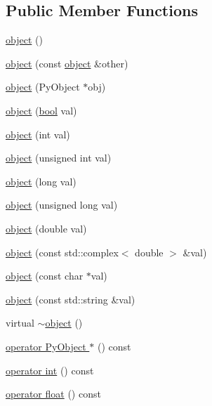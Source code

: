 \subsection*{Public Member Functions}
\begin{DoxyCompactItemize}
\item 
\hyperlink{classpy_1_1object_a34f56f5c741541da1b5b5b7615d378ad}{object} ()
\item 
\hyperlink{classpy_1_1object_a5d3964d8103ee8b8219dca5a631b679f}{object} (const \hyperlink{classpy_1_1object}{object} \&other)
\item 
\hyperlink{classpy_1_1object_a2fb78a0a73304065d05f899ca6edf3b6}{object} (Py\+Object $\ast$obj)
\item 
\hyperlink{classpy_1_1object_ab448083caebceb882ca1a9f420b668a3}{object} (\hyperlink{compiler_8h_abb452686968e48b67397da5f97445f5b}{bool} val)
\item 
\hyperlink{classpy_1_1object_a7d78412f168fe2d368f37c69cb0e1de6}{object} (int val)
\item 
\hyperlink{classpy_1_1object_a175aff9106537cf87a411ff0a492167e}{object} (unsigned int val)
\item 
\hyperlink{classpy_1_1object_a56a12afdd3e39902e1351b03bc92439b}{object} (long val)
\item 
\hyperlink{classpy_1_1object_a024ffbabddd7c2fe114010dcbb93cd14}{object} (unsigned long val)
\item 
\hyperlink{classpy_1_1object_aa8c8095ef08af5f57fc6a062839c55cf}{object} (double val)
\item 
\hyperlink{classpy_1_1object_a78bba16b5b85246c4fbc73ccde8ba530}{object} (const std\+::complex$<$ double $>$ \&val)
\item 
\hyperlink{classpy_1_1object_acadec5cd2e9b20b775d85b5a298e4136}{object} (const char $\ast$val)
\item 
\hyperlink{classpy_1_1object_a0febd86e0c60ab5d7e705e3f6d5cfaa3}{object} (const std\+::string \&val)
\item 
virtual \hyperlink{classpy_1_1object_ab7d19cd3ae9857dcfe0fcb49bf27cb35}{$\sim$object} ()
\item 
\hyperlink{classpy_1_1object_a7d9edeffb449f6defac8db598ba77748}{operator Py\+Object $\ast$} () const 
\item 
\hyperlink{classpy_1_1object_a7c4c69ee7cf6501b7a56c6501c0babd0}{operator int} () const 
\item 
\hyperlink{classpy_1_1object_a3644853e75a9df074da68617b81990b3}{operator float} () const 
\item 

\end{DoxyCompactItemize}
